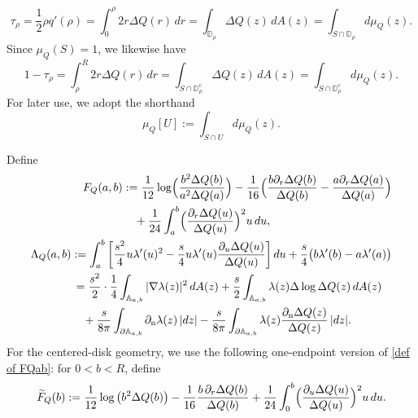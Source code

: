 \documentclass[a4paper]{article}
\numberwithin{equation}{section}
\begin{document}
\begin{description}
\begin{equation}
    \tau_{\rho}=\frac{1}{2}\rho q'(\rho)=\int_0^{\rho}2r\Delta Q(r)\,dr
    =\int_{\mathbb{D}_{\rho}}\Delta Q(z)\,dA(z)
    =\int_{S\cap\mathbb{D}_{\rho}}d\mu_{Q}(z).
\end{equation}
Since $\mu_Q(S)=1$, we likewise have
\begin{equation}
    1-\tau_{\rho}=\int_{\rho}^{R}2r\Delta Q(r)\,dr=\int_{S\cap\mathbb{D}_{\rho}^{\mathrm{c}}}\Delta Q(z)\,dA(z)
    =\int_{S\cap\mathbb{D}_{\rho}^{\mathrm{c}}}d\mu_{Q}(z). 
\end{equation}
For later use, we adopt the shorthand
\begin{equation}
    \mu_Q[U]:=\int_{S\cap U}d\mu_{Q}(z). 
\end{equation}
\item[(Potential and smooth-statistic functionals)]
Define
\begin{align}
\begin{split}
\label{def of FQab}
F_{Q}(a,b)
&:=\frac{1}{12}\log\Bigl(\frac{b^2\Delta Q(b)}{a^2\Delta Q(a)}\Bigr)
-\frac{1}{16}\Bigl(\frac{b\partial_r\Delta Q(b)}{\Delta Q(b)}-\frac{a\partial_r\Delta Q(a)}{\Delta Q(a)}\Bigr)
\\
&\quad 
+\frac{1}{24}\int_a^{b}\Bigl(\frac{\partial_r\Delta Q(u)}{\Delta Q(u)}\Bigr)^2u\,du,   
\end{split}    
\\
\begin{split}
\Lambda_Q(a,b)
&:=
\int_{a}^{b}
\bigg[
\frac{s^2}{4}u\lambda'(u)^2
-\frac{s}{4}u\lambda'(u)\frac{\partial_u\Delta Q(u)}{\Delta Q(u)}
\bigg]\,du
+\frac{s}{4}\bigl(b\lambda'(b)-a\lambda'(a)\bigr)
\\
&\,=\frac{s^2}{2}\cdot\frac{1}{4}\int_{\mathbb{A}_{a,b}}|\nabla\lambda(z)|^2\,dA(z)
+\frac{s}{2}\int_{\mathbb{A}_{a,b}}\lambda(z)\Delta \log \Delta Q(z)\,dA(z)\\
&\quad
+\frac{s}{8\pi}\int_{\partial\mathbb{A}_{a,b}}\partial_{\mathrm{n}}\lambda(z)\,|dz|-\frac{s}{8\pi}\int_{\partial\mathbb{A}_{a,b}}\lambda(z)\frac{\partial_{\mathrm{n}}\Delta Q(z)}{\Delta Q(z)}\,|dz|.
\end{split}
\end{align}
For the centered-disk geometry, we use the following one-endpoint version of
\eqref{def of FQab}: for $0<b<R$, define
\begin{equation}
\widetilde{F}_{Q}(b):=\frac{1}{12}\log\big(b^2\Delta Q(b)\bigr)-\frac{1}{16}\frac{b\,\partial_r\Delta Q(b)}{\Delta Q(b)}+\frac{1}{24}\int_0^b \Bigl(\frac{\partial_u\Delta Q(u)}{\Delta Q(u)}\Bigr)^2u\,du.
\end{equation}
\end{description}
\end{document}

